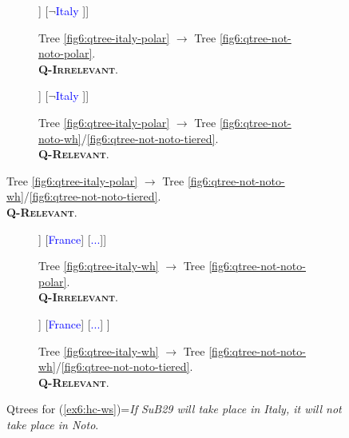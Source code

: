\begin{figure}[H]
	\centering
	\begin{subfigure}[b]{.45\linewidth}
		\centering
		\scalebox{1}
		{\begin{forest}
				[CS [\textcolor{blue}{Italy} [\textcolor{orange}{Noto}][\fbox{$\neg$\textcolor{orange}{Noto}$\cap$\textcolor{blue}{Italy}}]] [{$\neg$\textcolor{blue}{Italy}} ]]
		\end{forest}}
		\caption[]{Tree \ref{fig6:qtree-italy-polar} $\rightarrow$ Tree \ref{fig6:qtree-not-noto-polar}.\\\textsc{\textbf{Q-Irrelevant}}.}\label{fig6:tree-hc-ws-polar-polar-r}
	\end{subfigure}\hfill
	\begin{subfigure}[b]{.45\linewidth}
		\centering
		\scalebox{1}
		{\begin{forest}
				[CS [\textcolor{blue}{Italy} [\textcolor{orange}{Noto}] [\fbox{\textcolor{orange}{Rome}}] [\fbox{\textcolor{orange}{...}}]] [{$\neg$\textcolor{blue}{Italy}} ]]
		\end{forest}}
		\caption[]{Tree \ref{fig6:qtree-italy-polar} $\rightarrow$ Tree \ref{fig6:qtree-not-noto-wh}/\ref{fig6:qtree-not-noto-tiered}.\\\textsc{\textbf{Q-Relevant}}.}\label{fig6:tree-hc-ws-polar-wh-r}
	\end{subfigure}
\end{figure}
\begin{figure}[H]
\ContinuedFloat
\centering	
	\begin{subfigure}[b]{.45\linewidth}
		\centering
		\scalebox{1}
		{\begin{forest}
				[CS [\textcolor{blue}{Italy}[\textcolor{orange}{Noto}][\fbox{$\neg$\textcolor{orange}{Noto}$\cap$\textcolor{blue}{Italy}}]] [\textcolor{blue}{France}] [\textcolor{blue}{...}]]
		\end{forest}}
		\caption[]{Tree \ref{fig6:qtree-italy-wh} $\rightarrow$ Tree \ref{fig6:qtree-not-noto-polar}.\\\textsc{\textbf{Q-Irrelevant}}.}\label{fig6:tree-hc-ws-wh-polar-r}
	\end{subfigure}\hfill
	\begin{subfigure}[b]{.45\linewidth}
		\centering
		\scalebox{1}
		{\begin{forest}
				[CS [\textcolor{blue}{Italy}[\textcolor{orange}{Noto}] [\fbox{\textcolor{orange}{Rome}}] [\fbox{\textcolor{orange}{...}}]] [\textcolor{blue}{France}] [\textcolor{blue}{...}] ]
		\end{forest}}
		\caption[]{Tree \ref{fig6:qtree-italy-wh} $\rightarrow$ Tree \ref{fig6:qtree-not-noto-wh}/\ref{fig6:qtree-not-noto-tiered}.\\\textsc{\textbf{Q-Relevant}}.}\label{fig6:tree-hc-ws-wh-wh-r}
	\end{subfigure}
	\caption[]{Qtrees for (\ref{ex6:hc-ws})=\textit{If SuB29 will take place in Italy, it will not take place in Noto}.}
	\label{fig6:qtrees-hc-ws-r}
\end{figure}


